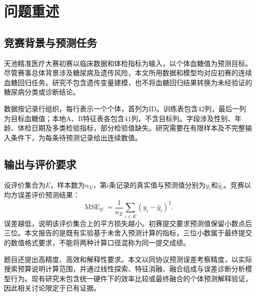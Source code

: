 \section{问题重述}\label{sec:problem}

\subsection{竞赛背景与预测任务}
天池精准医疗大赛初赛以临床数据和体检指标为输入，以个体血糖值为预测目标。尽管赛事总体背景涉及糖尿病及遗传风险，本文所用数据和模型均对应初赛的连续血糖回归任务。研究不包含遗传变量建模，也不将血糖回归结果转换为未经验证的糖尿病分类或诊断结论。

数据按记录行组织，每行表示一个个体，首列为ID。训练表包含42列，最后一列为目标血糖值；本地A、B特征表各包含41列，不含目标列。字段涉及性别、年龄、体检日期及多类检验指标，部分检验值缺失。研究需要在有限样本及不完整输入条件下，为每条待预测记录给出连续数值。

\subsection{输出与评价要求}
设评价集合为$E$，样本数为$n_E$，第$i$条记录的真实值与预测值分别为$y_i$和$\hat y_i$。竞赛以均方误差评价预测结果：
\begin{equation}
\operatorname{MSE}_E=\frac{1}{n_E}\sum_{i\in E}(y_i-\hat y_i)^2.
\label{eq:mse}
\end{equation}
误差越低，说明该评价集合上的平方损失越小。初赛提交要求预测值保留小数点后三位。本文报告的是既有实验基于未舍入预测计算的指标，三位小数属于最终提交的数值格式要求，不能将两种计算口径混称为同一提交成绩。

题目还提出高精度、高效和解释性要求。本文以同协议预测误差考察精度，以实际搜索预算说明计算范围，并通过线性探索、特征消融、融合组成与误差诊断分析模型行为。现有研究未包含统一硬件下的效率比较或最终融合的个体预测解释验证，因此相关讨论限定于已有证据。
